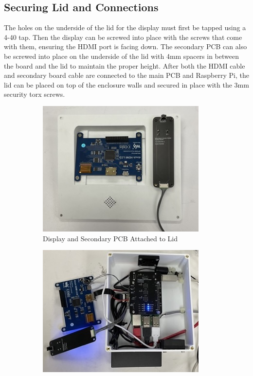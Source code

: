 \subsection{Securing Lid and Connections}
The holes on the underside of the lid for the display must first be tapped using a 4-40 tap. Then the display can be screwed into place with the screws that come with them, ensuring the HDMI port is facing down. The secondary PCB can also be screwed into place on the underside of the lid with 4mm spacers in between the board and the lid to maintain the proper height. After both the HDMI cable and secondary board cable are connected to the main PCB and Raspberry Pi, the lid can be placed on top of the enclosure walls and secured in place with the 3mm security torx screws.
    \begin{figure}[H]
        \centering
        \begin{subfigure}{.45\textwidth}
            \includegraphics[width=\textwidth]{graphics/Lid Internals.jpeg}
            \caption{Display and Secondary PCB Attached to Lid}
            \label{fig:Lid Internals}
        \end{subfigure}
        \begin{subfigure}{.45\textwidth}
            \includegraphics[width=\textwidth]{graphics/Internals Connections.jpeg}

\end{subfigure}
\end{figure}
